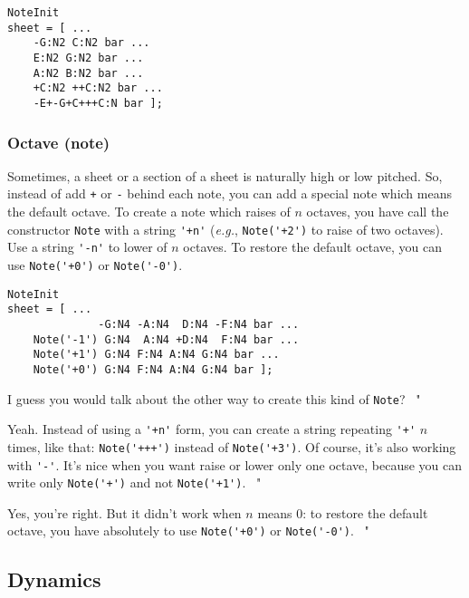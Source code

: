 \documentclass{article}
\newenvironment{meenv}{ \par \noindent \makebox[6em][r]{ \textcolor{mecolor}{Me}: " --~}}{~"}
\newenvironment{myselfenv}{ \par \noindent \makebox[6em][r]{ \textcolor{myselfcolor}{Myself}: " --~}}{~"}
\newcommand{ \me }[1]{%
\begin{meenv}%
	#1%
\end{meenv} }
\newcommand{ \myself }[1]{%
\begin{myselfenv}%
	#1%
\end{myselfenv} }
\begin{document}
\begin{lstlisting}
NoteInit
sheet = [ ...
	-G:N2 C:N2 bar ...
	E:N2 G:N2 bar ...
	A:N2 B:N2 bar ...
	+C:N2 ++C:N2 bar ...
	-E+-G+C+++C:N bar ];
\end{lstlisting}

\subsubsection{Octave (note)}
\label{sec:OctaveNote}

Sometimes, a sheet or a section of a sheet is naturally high or low pitched. So, instead of add \lstinline!+! or \lstinline!-! behind each note, you can add a special note which means the default octave. To create a note which raises of $n$ octaves, you have call the constructor \lstinline!Note! with a string \lstinline!'+n'! (\emph{e.g.}, \lstinline!Note('+2')! to raise of two octaves). Use a string \lstinline!'-n'! to lower of $n$ octaves. To restore the default octave, you can use \lstinline!Note('+0')! or \lstinline!Note('-0')!. \\

\begin{lstlisting}
NoteInit
sheet = [ ...
	          -G:N4 -A:N4  D:N4 -F:N4 bar ...
	Note('-1') G:N4  A:N4 +D:N4  F:N4 bar ...
	Note('+1') G:N4 F:N4 A:N4 G:N4 bar ...
	Note('+0') G:N4 F:N4 A:N4 G:N4 bar ];
\end{lstlisting}

\myself{I guess you would talk about the other way to create this kind of \lstinline!Note!?}
\me{Yeah. Instead of using a \lstinline!'+n'! form, you can create a string repeating \lstinline!'+'! $n$ times, like that: \lstinline!Note('+++')! instead of \lstinline!Note('+3')!. Of course, it's also working with \lstinline!'-'!. It's nice when you want raise or lower only one octave, because you can write only \lstinline!Note('+')! and not \lstinline!Note('+1')!.}
\myself{Yes, you're right. But it didn't work when $n$ means $0$: to restore the default octave, you have absolutely to use \lstinline!Note('+0')! or \lstinline!Note('-0')!.}

\subsection{Dynamics}
\label{sec:Dynamics}
\end{document}
